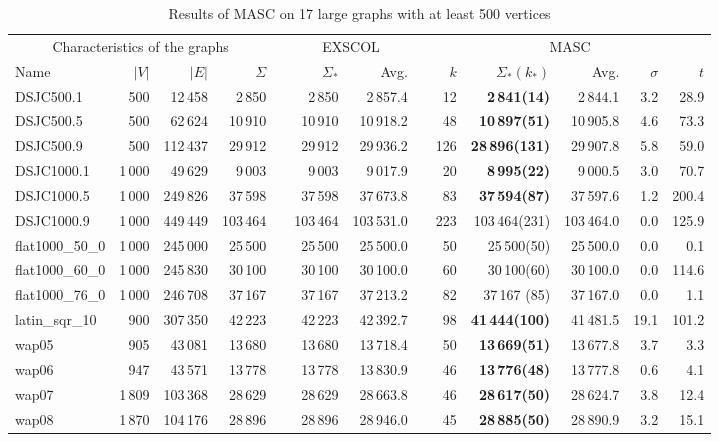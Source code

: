 \documentclass{elsart}
\begin{document}
\begin{table}\begin{scriptsize}
\caption{Results of MASC on 17 large graphs with at least 500 vertices}
\label{table_MASC_large}
\begin{tabular}{lrrrcrrcrrrrr}
\hline
\multicolumn{4}{c}{Characteristics of the graphs} && \multicolumn{2}{c}{EXSCOL} && \multicolumn{5}{c}{MASC}\\
\cline{1-4}\cline{6-7}\cline{9-13}
Name & $|V|$ & $|E|$ & $\Sigma$  && $\Sigma_*$ & Avg.&& $k$ &$\Sigma_*(k_*)$ & Avg. & $\sigma$ & $t$ \\
\hline
DSJC500.1    & 500 & 12\,458   &2\,850 &&2\,850 & 2\,857.4&&12&  \textbf{2\,841(14)} & 2\,844.1&3.2  & 28.9  \\
DSJC500.5    & 500 & 62\,624  &10\,910 &&10\,910 & 10\,918.2  &&48& \textbf{10\,897(51)}  & 10\,905.8 &4.6 & 73.3 \\
DSJC500.9    & 500 & 112\,437  &29\,912 &&29\,912 &29\,936.2 &&126&  \textbf{ 28\,896(131)} & 29\,907.8&5.8  & 59.0  \\
DSJC1000.1    &1\,000 & 49\,629   & 9\,003 && 9\,003 &9\,017.9 &&20&  \textbf{8\,995(22)}  & 9\,000.5&3.0  & 70.7  \\
DSJC1000.5    &1\,000 & 249\,826  &37\,598 &&37\,598 & 37\,673.8  &&83&  \textbf{37\,594(87)} &37\,597.6  &1.2 & 200.4 \\
DSJC1000.9    &1\,000 & 449\,449  &103\,464 &&103\,464 &103\,531.0&&223& 103\,464(231) & 103\,464.0& 0.0 & 125.9  \\

flat1000\_50\_0    & 1\,000 & 245\,000 & 25\,500 && 25\,500 &25\,500.0 &&50& 25\,500(50) & 25\,500.0&0.0 & 0.1 \\
flat1000\_60\_0    & 1\,000 & 245\,830 & 30\,100 && 30\,100 &30\,100.0 &&60& 30\,100(60) & 30\,100.0&0.0 & 114.6 \\
flat1000\_76\_0    & 1\,000 & 246\,708 & 37\,167 && 37\,167 &37\,213.2 &&82& 37\,167 (85) &37\,167.0 &0.0  &1.1  \\

latin\_sqr\_10    & 900 &307\,350 &42\,223 &&42\,223 &42\,392.7 &&98&  \textbf{41\,444(100)}& 41\,481.5&19.1  & 101.2 \\

wap05    & 905 & 43\,081 &13\,680 &&13\,680 &13\,718.4 &&50&  \textbf{13\,669(51)} & 13\,677.8&3.7  & 3.3 \\
wap06    & 947 & 43\,571 &13\,778 &&13\,778 &13\,830.9 &&46&  \textbf{13\,776(48)} & 13\,777.8&0.6 & 4.1 \\
wap07    & 1\,809 & 103\,368 &28\,629 &&28\,629 &28\,663.8 &&46&  \textbf{28\,617(50)} & 28\,624.7&3.8 & 12.4\\
wap08    & 1\,870 & 104\,176 &28\,896 &&28\,896 &28\,946.0 &&45&  \textbf{28\,885(50)} & 28\,890.9&3.2 & 15.1 \\


\end{tabular}
\end{scriptsize}
\end{table}
\end{document}

